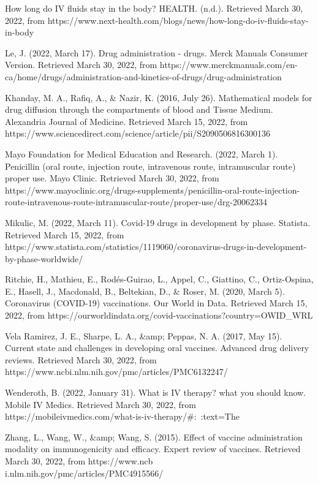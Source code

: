\documentclass{article}
\begin{document}
How long do IV fluids stay in the body? HEALTH. (n.d.). Retrieved March 30, 2022, from https://www.next-health.com/blogs/news/how-long-do-iv-fluids-stay-in-body 

Le, J. (2022, March 17). Drug administration - drugs. Merck Manuals Consumer Version. Retrieved March 30, 2022, from https://www.merckmanuals.com/en-ca/home/drugs/administration-and-kinetics-of-drugs/drug-administration 

Khanday, M. A., Rafiq, A., & Nazir, K. (2016, July 26). Mathematical models for drug diffusion through the compartments of blood and Tissue Medium. Alexandria Journal of Medicine. Retrieved March 15, 2022, from https://www.sciencedirect.com/science/article/pii/S2090506816300136

Mayo Foundation for Medical Education and Research. (2022, March 1). Penicillin (oral route, injection route, intravenous route, intramuscular route) proper use. Mayo Clinic. Retrieved March 30, 2022, from https://www.mayoclinic.org/drugs-supplements/penicillin-oral-route-injection-route-intravenous-route-intramuscular-route/proper-use/drg-20062334 

Mikulic, M. (2022, March 11). Covid-19 drugs in development by phase. Statista. Retrieved March 15, 2022, from https://www.statista.com/statistics/1119060/coronavirus-drugs-in-development-by-phase-worldwide/

Ritchie, H., Mathieu, E., Rodés-Guirao, L., Appel, C., Giattino, C., Ortiz-Ospina, E., Hasell, J., Macdonald, B., Beltekian, D., & Roser, M. (2020, March 5). Coronavirus (COVID-19) vaccinations. Our World in Data. Retrieved March 15, 2022, from https://ourworldindata.org/covid-vaccinations?country=OWID_WRL

Vela Ramirez, J. E., Sharpe, L. A., &amp; Peppas, N. A. (2017, May 15). Current state and challenges in developing oral vaccines. Advanced drug delivery reviews. Retrieved March 30, 2022, from https://www.ncbi.nlm.nih.gov/pmc/articles/PMC6132247/ 

Wenderoth, B. (2022, January 31). What is IV therapy? what you should know. Mobile IV Medics. Retrieved March 30, 2022, from https://mobileivmedics.com/what-is-iv-therapy/#:~:text=The%

Zhang, L., Wang, W., &amp; Wang, S. (2015). Effect of vaccine administration modality on immunogenicity and efficacy. Expert review of vaccines. Retrieved March 30, 2022, from https://www.ncb\\i.nlm.nih.gov/pmc/articles/PMC4915566/ 
\end{document}
